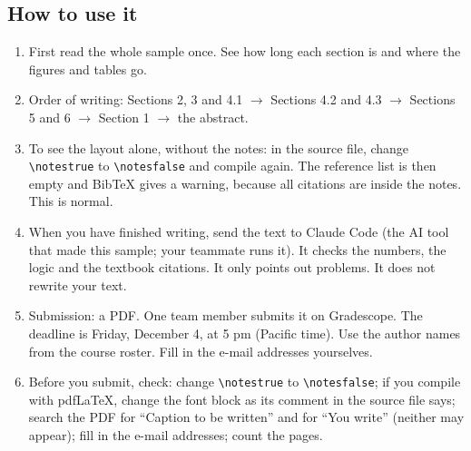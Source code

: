 \documentclass{article}
\begin{document}
\subsection*{How to use it}
\begin{enumerate}[nosep,leftmargin=1.5em]
\item First read the whole sample once. See how long each section is and where the figures and tables go.
\item Order of writing: Sections 2, 3 and 4.1 $\rightarrow$ Sections 4.2 and 4.3 $\rightarrow$ Sections 5 and 6 $\rightarrow$ Section 1 $\rightarrow$ the abstract.
\item To see the layout alone, without the notes: in the source file, change \texttt{\textbackslash notestrue} to \texttt{\textbackslash notesfalse} and compile again. The reference list is then empty and BibTeX gives a warning, because all citations are inside the notes. This is normal.
\item When you have finished writing, send the text to Claude Code (the AI tool that made this sample; your teammate runs it). It checks the numbers, the logic and the textbook citations. It only points out problems. It does not rewrite your text.
\item Submission: a PDF. One team member submits it on Gradescope. The deadline is Friday, December 4, at 5 pm (Pacific time). Use the author names from the course roster. Fill in the e-mail addresses yourselves.
\item Before you submit, check: change \texttt{\textbackslash notestrue} to \texttt{\textbackslash notesfalse}; if you compile with pdfLaTeX, change the font block as its comment in the source file says; search the PDF for ``Caption to be written'' and for ``You write'' (neither may appear); fill in the e-mail addresses; count the pages.
\end{enumerate}
\end{document}
